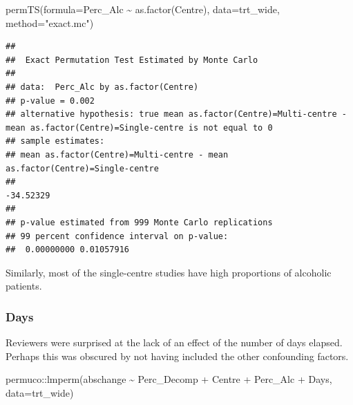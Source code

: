 \documentclass[
]{article}
\newenvironment{Shaded}{\begin{snugshade}}{\end{snugshade}}
\newcommand{\AttributeTok}[1]{\textcolor[rgb]{0.77,0.63,0.00}{#1}}
\newcommand{\FunctionTok}[1]{\textcolor[rgb]{0.00,0.00,0.00}{#1}}
\newcommand{\NormalTok}[1]{#1}
\newcommand{\SpecialCharTok}[1]{\textcolor[rgb]{0.00,0.00,0.00}{#1}}
\newcommand{\StringTok}[1]{\textcolor[rgb]{0.31,0.60,0.02}{#1}}
\begin{document}
\begin{Shaded}
\begin{Highlighting}[]
\FunctionTok{permTS}\NormalTok{(}\AttributeTok{formula=}\NormalTok{Perc\_Alc }\SpecialCharTok{\textasciitilde{}} \FunctionTok{as.factor}\NormalTok{(Centre), }\AttributeTok{data=}\NormalTok{trt\_wide,}
          \AttributeTok{method=}\StringTok{"exact.mc"}\NormalTok{)}
\end{Highlighting}
\end{Shaded}

\begin{verbatim}
## 
##  Exact Permutation Test Estimated by Monte Carlo
## 
## data:  Perc_Alc by as.factor(Centre)
## p-value = 0.002
## alternative hypothesis: true mean as.factor(Centre)=Multi-centre - mean as.factor(Centre)=Single-centre is not equal to 0
## sample estimates:
## mean as.factor(Centre)=Multi-centre - mean as.factor(Centre)=Single-centre 
##                                                                  -34.52329 
## 
## p-value estimated from 999 Monte Carlo replications
## 99 percent confidence interval on p-value:
##  0.00000000 0.01057916
\end{verbatim}

Similarly, most of the single-centre studies have high proportions of
alcoholic patients.

\hypertarget{days}{%
\subsubsection{Days}\label{days}}

Reviewers were surprised at the lack of an effect of the number of days
elapsed. Perhaps this was obscured by not having included the other
confounding factors.

\begin{Shaded}
\begin{Highlighting}[]
\NormalTok{permuco}\SpecialCharTok{::}\FunctionTok{lmperm}\NormalTok{(abschange }\SpecialCharTok{\textasciitilde{}}\NormalTok{ Perc\_Decomp }\SpecialCharTok{+}\NormalTok{ Centre }\SpecialCharTok{+}\NormalTok{ Perc\_Alc }\SpecialCharTok{+}\NormalTok{ Days, }\AttributeTok{data=}\NormalTok{trt\_wide)}
\end{Highlighting}
\end{Shaded}
\end{document}

